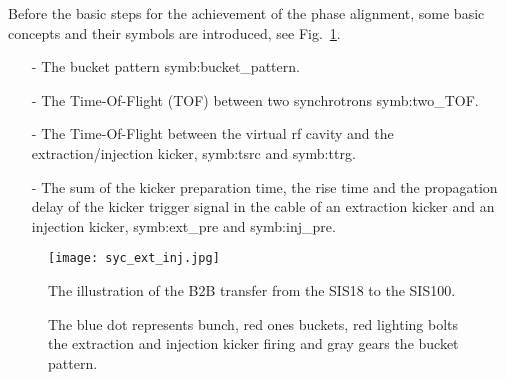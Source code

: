 
Before the basic steps for the achievement of the phase alignment, some basic concepts and their symbols are introduced, see Fig.~\ref{ext_inj_kicker}.

\begin{itemize}
\item[-] The bucket pattern \gls{symb:bucket_pattern}.
\item[-] The Time-Of-Flight (\gls{TOF}) between two synchrotrons \gls{symb:two_TOF}. 
\item[-] The Time-Of-Flight between the virtual rf cavity and the extraction/injection kicker, \gls{symb:tsrc} and \gls{symb:ttrg}. 
\item[-] The sum of the kicker preparation time, the rise time and the propagation delay of the kicker trigger signal in the cable of an extraction kicker and an injection kicker, \gls{symb:ext_pre} and \gls{symb:inj_pre}.
\end{itemize}
\begin{figure}[!htb]
   \centering   
   \texttt{[image: syc\_ext\_inj.jpg]}
   \caption{The illustration of the B2B transfer from the SIS18 to the SIS100.}
	\caption*{The blue dot represents bunch, red ones buckets, red lighting bolts the extraction and injection kicker firing and gray gears the bucket pattern.}
   \label{ext_inj_kicker}
\end{figure}
